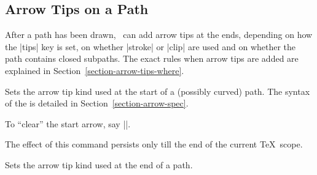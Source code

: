 \subsection{Arrow Tips on a Path}
\label{section-tips}

After a path has been drawn, \pgfname\ can add arrow tips at the ends,
depending on how the |tips| key is set, on whether |stroke| or |clip| are used
and on whether the path contains closed subpaths. The exact rules when arrow
tips are added are explained in Section~\ref{section-arrow-tips-where}.

\begin{command}{\pgfsetarrowsstart{}}
    Sets the arrow tip kind used at the start of a (possibly curved) path. The
    syntax of the  is detailed in
    Section~\ref{section-arrow-spec}.

    To ``clear'' the start arrow, say |\pgfsetarrowsstart{}|.
\begin{codeexample}[preamble={\usepgflibrary{arrows.meta}}]
\begin{pgfpicture}
  \pgfpathmoveto{\pgfpointorigin}
  \pgfpathlineto{\pgfpoint{1cm}{0cm}}
  \pgfpathmoveto{\pgfpoint{0cm}{2mm}}
  \pgfpathlineto{\pgfpoint{1cm}{2mm}}
\end{pgfpicture}
\end{codeexample}

    The effect of this command persists only till the end of the current \TeX\
    scope.
\end{command}

\begin{command}{\pgfsetarrowsend{}}
    Sets the arrow tip kind used at the end of a path.
\begin{codeexample}[preamble={\usepgflibrary{arrows.meta}}]
\begin{pgfpicture}
  \pgfpathmoveto{\pgfpointorigin}
  \pgfpathlineto{\pgfpoint{1cm}{0cm}}
\end{pgfpicture}
\end{codeexample}
\end{command}

